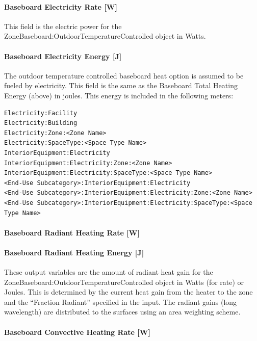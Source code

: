 \paragraph{Baseboard Electricity Rate {[}W{]}}\label{baseboard-electric-power-w-2}

This field is the electric power for the ZoneBaseboard:OutdoorTemperatureControlled object in Watts.

\paragraph{Baseboard Electricity Energy {[}J{]}}\label{baseboard-electric-energy-j-2}

The outdoor temperature controlled baseboard heat option is assumed to be fueled by electricity. This field is the same as the Baseboard Total Heating Energy (above) in joules. This energy is included in the following meters:
\begin{lstlisting}
Electricity:Facility
Electricity:Building
Electricity:Zone:<Zone Name>
Electricity:SpaceType:<Space Type Name>
InteriorEquipment:Electricity
InteriorEquipment:Electricity:Zone:<Zone Name>
InteriorEquipment:Electricity:SpaceType:<Space Type Name>
<End-Use Subcategory>:InteriorEquipment:Electricity
<End-Use Subcategory>:InteriorEquipment:Electricity:Zone:<Zone Name>
<End-Use Subcategory>:InteriorEquipment:Electricity:SpaceType:<Space Type Name>
\end{lstlisting}

\paragraph{Baseboard Radiant Heating Rate {[}W{]}}\label{baseboard-radiant-heating-rate-w-2a}

\paragraph{Baseboard Radiant Heating Energy {[}J{]}}\label{baseboard-radiant-heating-energy-j-2a}

These output variables are the amount of radiant heat gain for the Zone\-Baseboard:\-Outdoor\-Temperature\-Controlled object in Watts (for rate) or Joules. This is determined by the current heat gain from the heater to the zone and the ``Fraction Radiant'' specified in the input. The radiant gains (long wavelength) are distributed to the surfaces using an area weighting scheme.

\paragraph{Baseboard Convective Heating Rate {[}W{]}}\label{baseboard-convective-heating-rate-w-2a}

